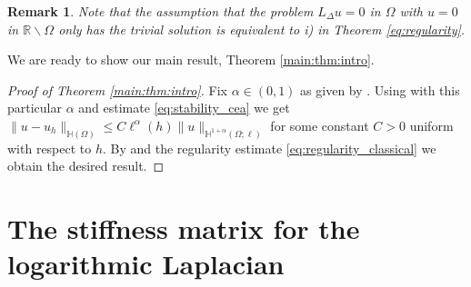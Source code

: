 \documentclass[11 pt]{article}
\newtheorem{remark}[theorem]{Remark}
\numberwithin{equation}{section}
\def\R{\mathbb{R}}
\begin{document}
\begin{remark}
Note that the assumption that the problem $L_\Delta u=0$ in $\Omega$ with $u=0$ in $\R\backslash  \Omega$ only has the trivial solution is equivalent to i) in Theorem \ref{eq:regularity}.
\end{remark}


We are ready to show our main result, Theorem \ref{main:thm:intro}.

\begin{proof}[Proof of Theorem \ref{main:thm:intro}]
Fix $\alpha\in(0,1)$ as given by . Using  with this particular $\alpha$ and estimate \eqref{eq:stability_cea} we get $\|u-u_h\|_{\mathbb H(\Omega)}\leq C\ell^{\alpha}(h)\|u\|_{\mathbb{H}^{1+\alpha}(\Omega;\ell)}$ for some constant $C>0$ uniform with respect to $h$. By  and the regularity estimate \eqref{eq:regularity_classical} we obtain the desired result.
\end{proof}


\section{The stiffness matrix for the logarithmic Laplacian}\label{sec:stiffness}
\end{document}
